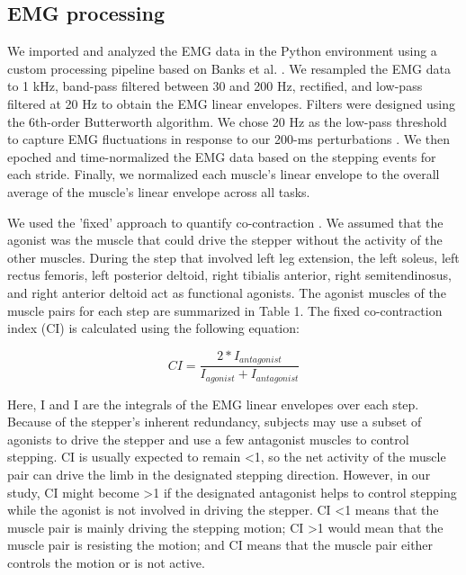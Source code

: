 \documentclass[../thesis_seyed.tex]{subfiles}
\begin{document}
\subsection{EMG processing}
We imported and analyzed the EMG data in the Python environment using a custom processing pipeline based on Banks et al. \cite{Banks2017-dn}. We resampled the EMG data to 1 kHz, band-pass filtered between 30 and 200 Hz, rectified, and low-pass filtered at 20 Hz to obtain the EMG linear envelopes. Filters were designed using the 6th-order Butterworth algorithm. We chose 20 Hz as the low-pass threshold to capture EMG fluctuations in response to our 200-ms perturbations \cite{Shiavi1998-vu}. We then epoched and time-normalized the EMG data based on the stepping events for each stride. Finally, we normalized each muscle's linear envelope to the overall average of the muscle's linear envelope across all tasks.

We used the 'fixed' approach to quantify co-contraction \cite{Banks2017-dn}. We assumed that the agonist was the muscle that could drive the stepper without the activity of the other muscles. During the step that involved left leg extension, the left soleus, left rectus femoris, left posterior deltoid, right tibialis anterior, right semitendinosus, and right anterior deltoid act as functional agonists. The agonist muscles of the muscle pairs for each step are summarized in Table 1. The fixed co-contraction index (CI) is calculated using the following equation:

\[CI=\frac{2*I_{antagonist}}{I_{agonist}+I_{antagonist}}\]

Here, I and I are the integrals of the EMG linear envelopes over each step. Because of the stepper's inherent redundancy, subjects may use a subset of agonists to drive the stepper and use a few antagonist muscles to control stepping. CI is usually expected to remain <1, so the net activity of the muscle pair can drive the limb in the designated stepping direction. However, in our study, CI might become >1 if the designated antagonist helps to control stepping while the agonist is not involved in driving the stepper. CI <1 means that the muscle pair is mainly driving the stepping motion; CI >1 would mean that the muscle pair is resisting the motion; and CI  means that the muscle pair either controls the motion or is not active.
\end{document}
